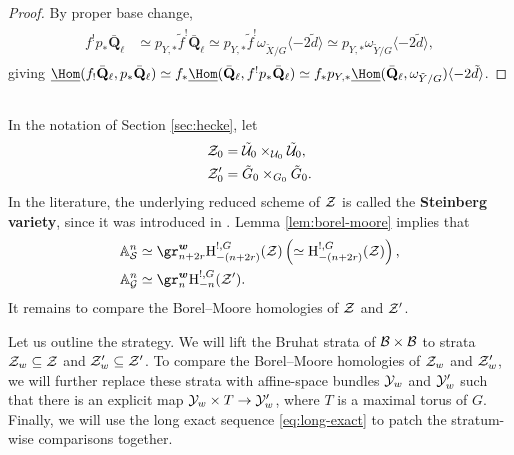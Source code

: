 \documentclass[a4paper,10pt,leqno]{amsart}
\theoremstyle{plain}
\theoremstyle{plain}
\theoremstyle{plain}
\theoremstyle{definition}
\theoremstyle{remark}
\newcommand{\dfemph}[1]{\textbf{#1}}
\newcommand{\QL}{\bar{\mathbf{Q}}_\ell}
\begin{document}
\begin{proof}
By proper base change,
\begin{align}\begin{split}
f^! p_\ast \QL 
&\simeq p_{Y, \ast} \tilde{f}^! \QL 
\simeq p_{Y, \ast} \tilde{f}^! \omega_{\tilde{X}/G} \langle -2\tilde{d}\rangle 
\simeq p_{Y, \ast} \omega_{\tilde{Y}/G} \langle -2\tilde{d}\rangle,
\end{split}\end{align}
giving $\SHom(f_! \QL, p_\ast \QL) \simeq f_\ast \SHom(\QL, f^! p_\ast \QL) \simeq f_\ast p_{Y, \ast} \SHom(\QL, \omega_{\tilde{Y}/G})\langle -2\tilde{d}\rangle$.
\end{proof}

\subsection{}

In the notation of Section \ref{sec:hecke}, let
\begin{align}
\cal{Z}_0 &= \tilde{\cal{U}}_0 \times_{\cal{U}_0} \tilde{\cal{U}}_0,\\
\cal{Z}'_0 &= \tilde{G}_0 \times_{G_0} \tilde{G}_0.
\end{align}
In the literature, the underlying reduced scheme of $\cal{Z}$ is called the \dfemph{Steinberg variety}, since it was introduced in \cite{steinberg_1976}.
Lemma \ref{lem:borel-moore} implies that
\begin{align}
\label{eq:z}
\bb{A}_\cal{S}^n &\simeq \gr_{n + 2r}^{\bm{w}} \ur{H}_{-(n + 2r)}^{!, G}(\cal{Z}) \pa{\simeq \ur{H}_{-(n + 2r)}^{!, G}(\cal{Z})},\\
\label{eq:z-prime}
\bb{A}_\cal{G}^n &\simeq \gr_n^{\bm{w}} \ur{H}_{-n}^{!, G}(\cal{Z}').
\end{align}
It remains to compare the Borel--Moore homologies of $\cal{Z}$ and $\cal{Z}'$.

Let us outline the strategy.
We will lift the Bruhat strata of $\cal{B} \times \cal{B}$ to strata $\cal{Z}_w \subseteq \cal{Z}$ and $\cal{Z}'_w \subseteq \cal{Z}'$.
To compare the Borel--Moore homologies of $\cal{Z}_w$ and $\cal{Z}'_w$, we will further replace these strata with affine-space bundles $\cal{Y}_w$ and $\cal{Y}'_w$ such that there is an explicit map $\cal{Y}_w \times T \to \cal{Y}'_w$, where $T$ is a maximal torus of $G$.
Finally, we will use the long exact sequence \eqref{eq:long-exact} to patch the stratum-wise comparisons together.

\subsection{}
\end{document}
